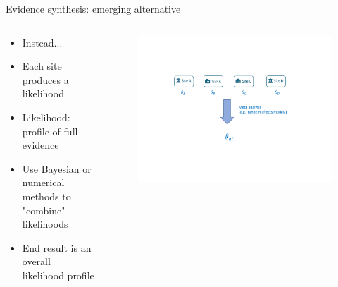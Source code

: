 \documentclass[aspectratio=169,xcolor=dvipsnames]{beamer}					%
\begin{document}
{
\begin{frame}{Evidence synthesis: emerging alternative}
\begin{columns}
\begin{column}{0.45\textwidth}
\begin{itemize}
    \item Instead...
    \item Each site produces a likelihood
    \item Likelihood: profile of full evidence
    \item Use Bayesian or numerical methods to "combine" likelihoods
    \item End result is an overall likelihood profile
\end{itemize}

\end{column}
\begin{column}{0.6\textwidth}

\begin{figure}
    \centering
    \hspace*{-0.23in}
    \includegraphics[trim = 0.5in 1in 0.5in 1.2in, clip, width=1.2\textwidth, page=2]{figures/Legend_hightlight_method_graphs.pdf}
\end{figure}
\end{column}

\end{columns}

\end{frame}
}
\end{document}
